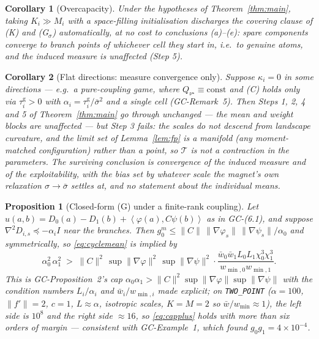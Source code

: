 \documentclass[11pt]{article}
\newtheorem{proposition}{Proposition}
\newtheorem{corollary}{Corollary}
\theoremstyle{definition}
\newcommand{\cT}{\mathcal{T}}
\newcommand{\ip}[2]{\left\langle #1, #2 \right\rangle}
\newcommand{\GC}[1]{\textsf{GC-#1}}
\begin{document}
\begin{corollary}[Overcapacity]\label{cor:overcap}
Under the hypotheses of Theorem~\ref{thm:main}, taking $K_i \gg M_i$ with a
space-filling initialisation discharges the covering clause of (K) and
(G$_\sigma$) automatically, at no cost to conclusions (a)--(e): spare components
converge to branch points of whichever cell they start in, i.e.\ to genuine atoms,
and the induced measure is unaffected (Step 5).
\end{corollary}

\begin{corollary}[Flat directions: measure convergence only]\label{cor:flat}
Suppose $\kappa_i = 0$ in some directions --- e.g.\ a pure-coupling game, where
$Q_{\nu^\star} \equiv \mathrm{const}$ and (C) holds only via
$\tau^{\mathrm g}_i > 0$ with $\alpha_i = \tau^{\mathrm g}_i/\bar\sigma^2$ and a
single cell (\GC{Remark~5}). Then Steps 1, 2, 4 and 5 of
Theorem~\ref{thm:main} go through unchanged --- the mean and weight blocks are
unaffected --- but Step 3 fails: the scales do not descend from landscape
curvature, and the limit set of Lemma~\ref{lem:fp} is a manifold (any
moment-matched configuration) rather than a point, so $\cT$ is not a contraction
in the parameters. The surviving conclusion is convergence of the \emph{induced
measure} and of the exploitability, with the bias set by whatever scale the
magnet's own relaxation $\sigma \to \bar\sigma$ settles at, and no statement about
the individual means.
\end{corollary}

\begin{proposition}[Closed-form (G) under a finite-rank coupling]
\label{prop:cap}
Let $u(a,b) = D_0(a) - D_1(b) + \ip{\varphi(a)}{C\psi(b)}$ as in \GC{(6.1)}, and
suppose $\nabla^2 D_{i,s} \preceq -\alpha_i I$ near the branches. Then
$g^m_0 \le \|C\|\,\|\nabla\varphi_s\|\,\|\nabla\psi_s\|/\alpha_0$ and
symmetrically, so \eqref{eq:cyclemean} is implied by
\begin{equation}\label{eq:capplus}
  \alpha_0^2\,\alpha_1^2 \;>\;
  \|C\|^2\,\sup\|\nabla\varphi\|^2\,\sup\|\nabla\psi\|^2 \cdot
  \frac{\bar w_0\bar w_1 L_0L_1 \chi_0^3\chi_1^3}{w_{\min,0}w_{\min,1}} .
\end{equation}
This is \GC{Proposition~2}'s cap $\alpha_0\alpha_1 > \|C\|^2\sup\|\nabla\varphi\|
\sup\|\nabla\psi\|$ with the condition numbers $L_i/\alpha_i$ and
$\bar w_i/w_{\min,i}$ made explicit; on \texttt{TWO\_POINT}
($\alpha = 100$, $\|f'\| = 2$, $c = 1$, $L \approx \alpha$, isotropic scales,
$K = M = 2$ so $\bar w/w_{\min} \approx 1$), the left side is $10^8$ and the right
side $\approx 16$, so \eqref{eq:capplus} holds with more than six orders of
margin --- consistent with \GC{Example~1}, which found $g_0g_1 = 4\times10^{-4}$.
\end{proposition}
\end{document}

